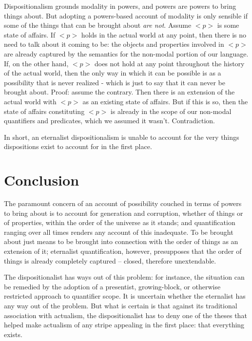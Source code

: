 \documentclass[]{article}
\begin{document}
Dispositionalism grounds modality in powers, and powers are powers to bring things about. But adopting a powers-based account of modality is only sensible if some of the things that can be brought about \textit{are not}. Assume $<p>$ is some state of affairs. If $<p>$ holds in the actual world at any point, then there is no need to talk about it coming to be: the objects and properties involved in $<p>$ are already captured by the semantics for the non-modal portion of our language.  If, on the other hand, $<p>$ does not hold at any point throughout the history of the actual world, then the only way in which it can be possible is as a possibility that is never realized - which is just to say that it can never be brought about. Proof: assume the contrary. Then there is an extension of the actual world with $<p>$ as an existing state of affairs. But if this is so, then the state of affairs constituting $<p>$ is already in the scope of our non-modal quantifiers and predicates, which we assumed it wasn't. Contradiction.

In short, an eternalist dispositionalism is unable to account for the very things dispositions exist to account for in the first place.

\section{Conclusion}
The paramount concern of an account of possibility couched in terms of powers to bring about is to account for generation and corruption, whether of things or of properties, within the order of the universe as it stands; and quantification ranging over all times renders any account of this inadequate. To be brought about just means to be brought into connection with the order of things as an extension of it; eternalist quantification, however, presupposes that the order of things is already completely captured – closed, therefore unextendable.

The dispositionalist has ways out of this problem: for instance, the situation can be remedied by the adoption of a presentist, growing-block, or otherwise restricted approach to quantifier scope. It is uncertain whether the eternalist has any way out of the problem. But what is certain is that against its traditional association with actualism, the dispositionalist has to deny one of the theses that helped make actualism of any stripe appealing in the first place: that everything exists.


\end{document}
